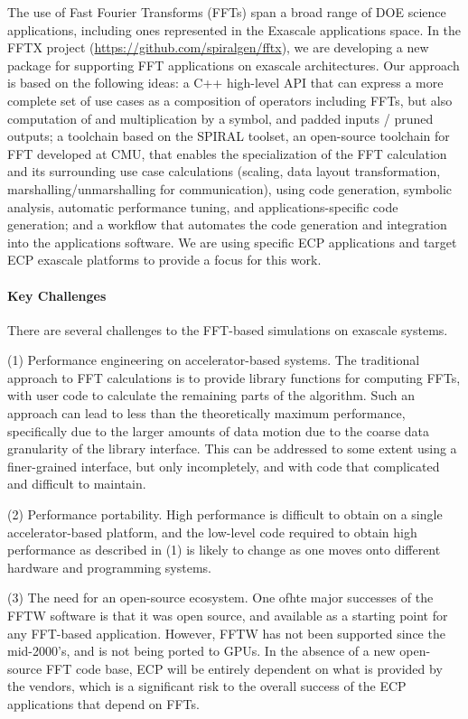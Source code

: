 The use of Fast Fourier Transforms (FFTs) span a broad range of DOE science applications, including ones represented in the Exascale applications space.
In the FFTX project (\url{https://github.com/spiralgen/fftx}), 
we are developing a new package for supporting FFT applications on exascale architectures. Our approach is based on the following ideas: a C++ high-level API that can express a more complete set of use cases as a composition of operators including FFTs, but also computation of and multiplication by a symbol, and padded inputs / pruned outputs; a toolchain based on the SPIRAL toolset, an open-source toolchain for FFT developed at CMU, that enables the
specialization of the FFT calculation and its surrounding use case calculations (scaling, data layout transformation, marshalling/unmarshalling for communication), using code generation, symbolic analysis, automatic performance tuning, and applications-specific code generation; and a workflow that automates the code generation and integration into the applications software. We are using specific ECP applications and target ECP exascale platforms to provide a focus for this work.

\paragraph{Key Challenges}
There are several challenges to the FFT-based simulations on exascale systems. 
\begin{trivlist}
\item
(1) Performance engineering on accelerator-based systems. The traditional approach to FFT calculations is to provide library functions for computing FFTs, with user code to calculate the remaining parts of the algorithm. Such an approach can lead to less than the theoretically maximum performance, specifically due to the larger amounts of data motion due to the coarse data granularity of the library interface. This can be addressed to some extent using a finer-grained interface, but only incompletely, and with code that complicated and difficult to maintain.
\item
(2) Performance portability. High performance is difficult to obtain on a single accelerator-based platform, and the low-level code required to obtain high performance as described in (1) is likely to change as one moves onto different hardware and programming systems. 

\item
(3)
The need for an open-source ecosystem. One ofhte major successes of the FFTW software is that it was open source, and available as a starting point for any FFT-based application. However, FFTW has not been supported since the mid-2000's, and is not being ported to GPUs. In the absence of a new open-source FFT code base, ECP will be entirely dependent on what is provided by the vendors, which is a significant risk to the overall success of the ECP applications that depend on FFTs. 
\end{trivlist}

